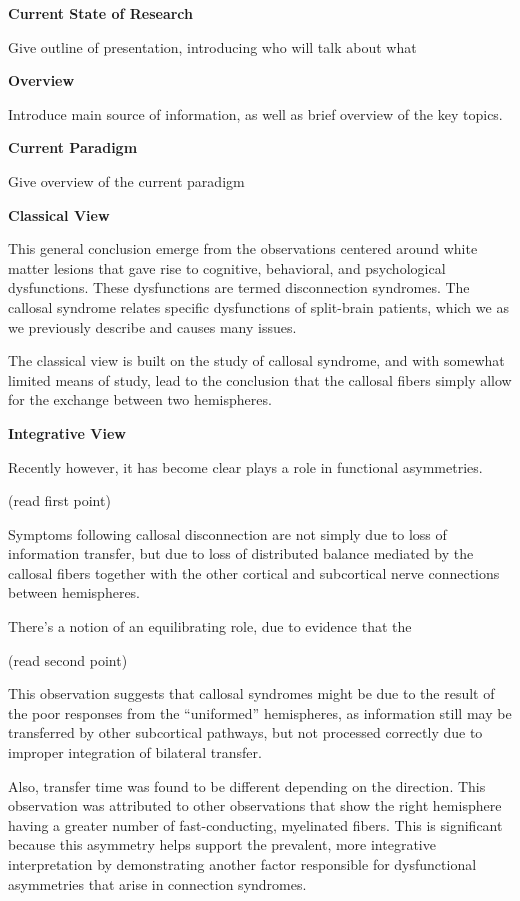 \documentclass[basic]{inVerba-notes}
\begin{document}
    
\textbf{Current State of Research}

Give outline of presentation, introducing who will talk about what

\textbf{Overview}

Introduce main source of information, as well as brief overview of the key topics.

\textbf{Current Paradigm}

Give overview of the current paradigm

\textbf{Classical View}

This general conclusion emerge from the observations centered around white matter lesions that gave rise to cognitive, behavioral, and psychological dysfunctions. These dysfunctions are termed disconnection syndromes. The callosal syndrome relates specific dysfunctions of split-brain patients, which we as we previously describe and causes many issues.

The classical view is built on the study of callosal syndrome, and with somewhat limited means of study, lead to the conclusion that the callosal fibers simply allow for the exchange between two hemispheres.

\textbf{Integrative View}

Recently however, it has become clear plays a role in functional asymmetries. 

(read first point)

Symptoms following callosal disconnection are not simply due to loss of information transfer, but due to loss of distributed balance mediated by the callosal fibers together with the other cortical and subcortical nerve connections between hemispheres.

There's a notion of an equilibrating role, due to evidence that the

(read second point)

This observation suggests that callosal syndromes might be due to the result of the poor responses from the ``uniformed'' hemispheres, as information still may be transferred by other subcortical pathways, but not processed correctly due to improper integration of bilateral transfer. 

Also, transfer time was found to be different depending on the direction. This observation was attributed to other observations that show the right hemisphere having a greater number of fast-conducting, myelinated fibers. This is significant because this asymmetry helps support the prevalent, more integrative interpretation by demonstrating another factor responsible for dysfunctional asymmetries that arise in connection syndromes.
\end{document}
